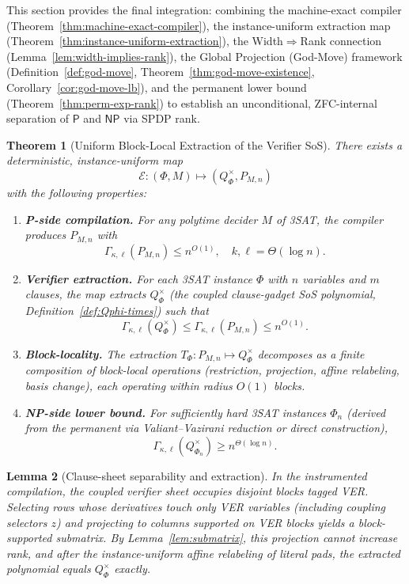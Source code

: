 \documentclass[12pt]{article}
\newtheorem{theorem}{Theorem}
\newtheorem{lemma}[theorem]{Lemma}
\theoremstyle{definition}
\theoremstyle{definition}
\theoremstyle{remark}
\theoremstyle{remark}
\begin{document}
This section provides the final integration: combining the machine-exact compiler (Theorem~\ref{thm:machine-exact-compiler}), the instance-uniform extraction map (Theorem~\ref{thm:instance-uniform-extraction}), the Width$\Rightarrow$Rank connection (Lemma~\ref{lem:width-implies-rank}), the Global Projection (God-Move) framework (Definition~\ref{def:god-move}, Theorem~\ref{thm:god-move-existence}, Corollary~\ref{cor:god-move-lb}), and the permanent lower bound (Theorem~\ref{thm:perm-exp-rank}) to establish an unconditional, ZFC-internal separation of $\mathsf{P}$ and $\mathsf{NP}$ via SPDP rank.

\begin{theorem}[Uniform Block-Local Extraction of the Verifier SoS]\label{thm:uniform-extraction-verifier-sos}
There exists a deterministic, instance-uniform map
\[
\mathcal{E} : (\Phi, M) \longmapsto (Q^{\times}_\Phi, P_{M,n})
\]
with the following properties:
\begin{enumerate}
\item \textbf{P-side compilation.} For any polytime decider $M$ of 3SAT, the compiler produces $P_{M,n}$ with
\[
\Gamma_{\kappa,\ell}(P_{M,n}) \leq n^{O(1)}, \quad k, \ell = \Theta(\log n).
\]

\item \textbf{Verifier extraction.} For each 3SAT instance $\Phi$ with $n$ variables and $m$ clauses, the map extracts $Q^{\times}_\Phi$ (the coupled clause-gadget SoS polynomial, Definition~\ref{def:Qphi-times}) such that
\[
\Gamma_{\kappa,\ell}(Q^{\times}_\Phi) \leq \Gamma_{\kappa,\ell}(P_{M,n}) \leq n^{O(1)}.
\]

\item \textbf{Block-locality.} The extraction $T_\Phi : P_{M,n} \mapsto Q^{\times}_\Phi$ decomposes as a finite composition of block-local operations (restriction, projection, affine relabeling, basis change), each operating within radius $O(1)$ blocks.

\item \textbf{NP-side lower bound.} For sufficiently hard 3SAT instances $\Phi_n$ (derived from the permanent via Valiant--Vazirani reduction or direct construction),
\[
\Gamma_{\kappa,\ell}(Q^{\times}_{\Phi_n}) \geq n^{\Theta(\log n)}.
\]
\end{enumerate}
\end{theorem}

\begin{lemma}[Clause-sheet separability and extraction]
\label{lem:sheet-extract}
In the instrumented compilation, the coupled verifier sheet occupies disjoint blocks tagged \textsf{VER}.
Selecting rows whose derivatives touch only \textsf{VER} variables (including coupling selectors $z$) and projecting to columns supported on \textsf{VER} blocks yields a block-supported submatrix.
By Lemma~\ref{lem:submatrix}, this projection cannot increase rank, and after the instance-uniform affine relabeling of literal pads, the extracted polynomial equals $Q^{\times}_\Phi$ exactly.
\end{lemma}
\end{document}
